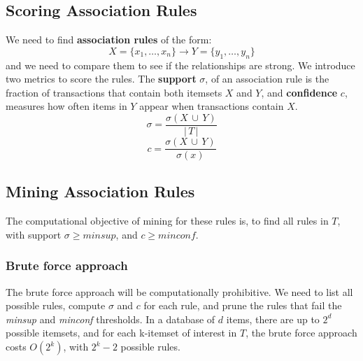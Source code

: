 \documentclass[9pt,twocolumn]{article}
\begin{document}
\subsection*{Scoring Association Rules}
We need to find \textbf{association rules} of the form:
\begin{equation}
	X=\{x_1, \ldots, x_n\} \rightarrow Y=\{y_1, \ldots, y_n\}
\end{equation}and we need to compare them to see if the relationships are strong. We introduce two metrics to score the rules. The \textbf{support} $\sigma$, of an association rule is the fraction of transactions that contain both itemsets $X$ and $Y$, and \textbf{confidence} $c$, measures how often items in $Y$ appear when transactions contain $X$.
\begin{equation}
	\sigma = \frac{\sigma(X\,\cup\,Y)}{|\,T\,|}
\end{equation}
\begin{equation}
	c = \frac{\sigma(X\,\cup\,Y)}{\sigma(x)}
\end{equation}

\subsection*{Mining Association Rules}
The computational objective of mining for these rules is, to find all rules in $T$, with support $\sigma \geq minsup$, and $c \geq minconf$.

\subsubsection*{Brute force approach}
The brute force approach will be computationally prohibitive. We need to list all possible rules, compute $\sigma$ and $c$ for each rule, and prune the rules that fail the \textit{minsup} and \textit{minconf} thresholds. In a database of $d$ items, there are up to $2^d$ possible itemsets, and for each k-itemset of interest in $T$, the brute force approach costs $O(2^k)$, with $2^k - 2$ possible rules.
\end{document}
